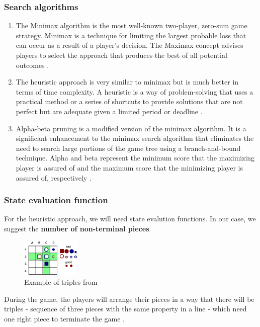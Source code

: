 \documentclass[paper=a4, fontsize=11pt]{article} %
\begin{document}
\subsubsection{Search algorithms} 
\begin{enumerate}
	\item 
	The Minimax algorithm is the most well-known two-player, zero-sum game strategy. Minimax is a technique for limiting the largest probable loss that can occur as a result of a player’s decision. The Maximax concept advises players to select the approach that produces the best of all potential outcomes \cite{StrToPlay}.
	
	\item 
	The heuristic approach is very similar to minimax but is much better in terms of time complexity. A heuristic is a way of problem-solving that uses a practical method or a series of shortcuts to provide solutions that are not perfect but are adequate given a limited period or deadline \cite{Heu}.
	
	\item
	Alpha-beta pruning is a modified version of the minimax algorithm. It is a significant enhancement to the minimax search algorithm that eliminates the need to search large portions of the game tree using a branch-and-bound technique. Alpha and beta represent the minimum score that the maximizing player is assured of and the maximum score that the minimizing player is assured of, respectively \cite{AB}.
\end{enumerate}

\subsubsection{State evaluation function} 
For the heuristic approach, we will need state evalution functions. In our case, we suggest the \textbf{number of non-terminal pieces}. 

\begin{figure}
	\centering
	\includegraphics[width=0.25\textwidth]{heuristic_function}
	\caption{Example of triples from \cite{cpluscode}}
\end{figure}

During the game, the players will arrange their pieces in a way that there will be triples - sequence of three pieces with the same property in a line - which need one right piece to terminate the game \cite{cpluscode}.
\end{document}
